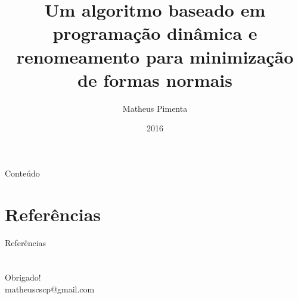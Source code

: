 \documentclass{beamer}
\title[]{Um algoritmo baseado em programação dinâmica e renomeamento para minimização de formas normais}
\author{Matheus Pimenta}
\institute[UnB]{Universidade de Brasília}
\date{2016}
\begin{document}
\begin{frame}
\titlepage
\end{frame}

\begin{frame}{Conteúdo}
  \tableofcontents
\end{frame}







\section{Referências}

\begin{frame}{Referências}
	
	
\end{frame}

\section*{}

\begin{frame}
	\begin{center}
		Obrigado!\\
		matheuscscp@gmail.com
	\end{center}
\end{frame}
\end{document}
